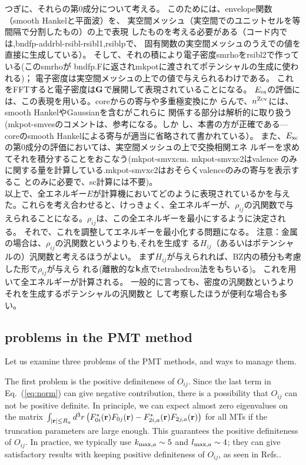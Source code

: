 \documentclass[twocolumn,showpacs,preprintnumbers,amsmath,amssymb,floatfix]{revtex4-1}
\newcommand{\bfk}{{\bf k}}
\newcommand{\bfr}{{\bf r}}
\newcommand{\bfG}{{\bf G}}
\newcommand{\req}[1]{\mbox{Eq.~\!(\ref{#1})}}
\def\nzcv{n^{\rm Zcv}}
\def\intaa{\int_{|\bfr|\leq R_a}}
\def\nzcv{n^{\rm Zcv}}
\def\intaa{\int_{|\bfr|\leq R_a}}
\begin{document}
つぎに、それらの第0成分について考える。
このためには、envelope関数（smooth Hankelと平面波）を、
実空間メッシュ（実空間でのユニットセルを等間隔で分割したもの）の上で表現
したものを考える必要がある（コード内では,bndfp-addrbl-rsibl-rsibl1,rsiblpで、
固有関数の実空間メッシュのうえでの値を直接に生成している）。
そして、それの積により電子密度smrhoをrsibl2で作っている(このsmrhoが
bndfp.Fに返されmkpotに渡されてポテンシャルの生成に使われる)；
電子密度は実空間メッシュの上での値で与えられるわけである。
これをFFTすると電子密度は$\bfG$で展開して表現されていることになる。
$E_{\rm es}$の評価には、この表現を用いる。coreからの寄与や多重極変換にか
らんで、$\nzcv$には、smooth HankelやGaussianを含むがこれらに
関係する部分は解析的に取り扱う(mkpot-smvesのコメントは、参考になる。しか
し、本書の方が正確である---coreのsmooth Hankelによる寄与が適当に省略されて書かれている）。
また、$E_{\rm xc}$の第0成分の評価においては、実空間メッシュの上で交換相関エネ
ルギーを求めてそれを積分することをおこなう(mkpot-smvxcm. mkpot-smvxc2はvalence
のみに関する量を計算している.mkpot-smvxc2はおそらくvalenceのみの寄与を表示するこ
とのみに必要で、sc計算には不要)。\\

以上で、全エネルギー$E$が計算機においてどのように表現されているかを与え
た。これらを考え合わせると、けっきょく、全エネルギーが、$\rho_{ij}$の汎関数で与
えられることになる。$\rho_{ij}$は、この全エネルギーを最小にするように決定される。
それで、これを調整してエネルギーを最小化する問題になる。
{\small 注意：金属の場合は、$\rho_{ij}$の汎関数というよりも,それを生成す
る$H_{ij}$（あるいはポテンシャルの）汎関数と考えるほうがよい。
まず$H_{ij}$が与えられれば、BZ内の積分も考慮した形で$\rho_{ij}$が与えら
れる(離散的な$\bfk$点でtetrahedron法をもちいる)。
これを用いて全エネルギーが計算される。
一般的に言っても、密度の汎関数というよりそれを生成するポテンシャルの汎関数と
して考察したほうが便利な場合も多い。}

\subsection{problems in the PMT method}
\label{sec:problems}
Let us examine three problems of the PMT methods, and ways to
manage them.

The first problem is the positive definiteness of $O_{ij}$.
Since the last term in \req{eq:norm} can give negative contribution,
there is a possibility that $O_{ij}$ can not be positive definite.
In principle, we can expect almost zero eigenvalues on the matrix
$\intaa d^3r \left(F^*_{0i}(\bfr)F_{0j}(\bfr)-F^*_{2i,a}(\bfr)F_{2j,a}(\bfr)\right)$ 
for all MTs if the truncation parameters are large enough. 
This guarantees the positive definiteness of $O_{ij}$.
In practice, we typically use $k_{{\rm max},a} \sim 5$ 
and $l_{{\rm max},a}\sim 4$; they
can give satisfactory results with keeping positive
definiteness of $O_{ij}$, as seen in Refs.\cite{pmt1,kotani_linearized_2013}.
\end{document}
